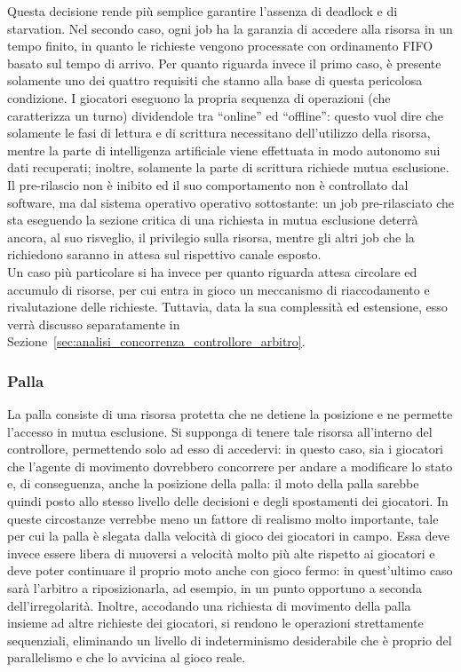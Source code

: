 Questa decisione rende più semplice garantire l'assenza di deadlock e di starvation. Nel secondo caso, ogni job ha la garanzia di accedere alla risorsa in un tempo finito, in quanto le richieste vengono processate con ordinamento FIFO basato sul tempo di arrivo. Per quanto riguarda invece il primo caso, è presente solamente uno dei quattro requisiti che stanno alla base di questa pericolosa condizione. I giocatori eseguono la propria sequenza di operazioni (che caratterizza un turno) dividendole tra ``online'' ed ``offline'': questo vuol dire che solamente le fasi di lettura e di scrittura necessitano dell'utilizzo della risorsa, mentre la parte di intelligenza artificiale viene effettuata in modo autonomo sui dati recuperati; inoltre, solamente la parte di scrittura richiede mutua esclusione. Il pre-rilascio non è inibito ed il suo comportamento non è controllato dal software, ma dal sistema operativo operativo sottostante: un job pre-rilasciato che sta eseguendo la sezione critica di una richiesta in mutua esclusione deterrà ancora, al suo risveglio, il privilegio sulla risorsa, mentre gli altri job che la richiedono saranno in attesa sul rispettivo canale esposto.\\

Un caso più particolare si ha invece per quanto riguarda attesa circolare ed accumulo di risorse, per cui entra in gioco un meccanismo di riaccodamento e rivalutazione delle richieste. Tuttavia, data la sua complessità ed estensione, esso verrà discusso separatamente in Sezione~\ref{sec:analisi_concorrenza_controllore_arbitro}.

\subsubsection{Palla}
\label{sec:analisi_concorrenza_palla}

La palla consiste di una risorsa protetta che ne detiene la posizione e ne permette l'accesso in mutua esclusione. Si supponga di tenere tale risorsa all'interno del controllore, permettendo solo ad esso di accedervi: in questo caso, sia i giocatori che l'agente di movimento dovrebbero concorrere per andare a modificare lo stato e, di conseguenza, anche la posizione della palla: il moto della palla sarebbe quindi posto allo stesso livello delle decisioni e degli spostamenti dei giocatori. In queste circostanze verrebbe meno un fattore di realismo molto importante, tale per cui la palla è slegata dalla velocità di gioco dei giocatori in campo. Essa deve invece essere libera di muoversi a velocità molto più alte rispetto ai giocatori e deve poter continuare il proprio moto anche con gioco fermo: in quest'ultimo caso sarà l'arbitro a riposizionarla, ad esempio, in un punto opportuno a seconda dell'irregolarità. Inoltre, accodando una richiesta di movimento della palla insieme ad altre richieste dei giocatori, si rendono le operazioni strettamente sequenziali, eliminando un livello di indeterminismo desiderabile che è proprio del parallelismo e che lo avvicina al gioco reale.\\


